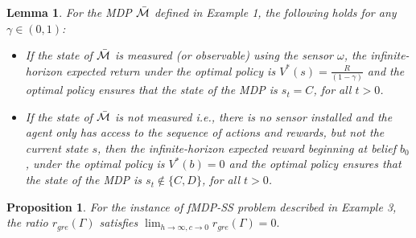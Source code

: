 \documentclass[10pt,a4paper]{amsart}
\newtheorem{lemma}{Lemma}
\newtheorem{proposition}{Proposition}
\begin{document}
 \begin{lemma}
 \label{lma1}
For the MDP $\Bar{\mathcal{M}}$ defined in Example 1, the following holds for any $\gamma\in (0,1)$:
\begin{itemize}
    \item [(i)] If the state of  $\Bar{\mathcal{M}}$ is measured (or observable) using the sensor $\omega$, the infinite-horizon expected return under the optimal policy is $V^*(s) = \frac{R}{(1-\gamma)}$ and the optimal policy ensures that the state of the MDP is $s_t=C$, for all $t>0$. 
    \item[(ii)] If the state of $\Bar{\mathcal{M}}$ is not measured i.e., there is no sensor installed and the agent only has access to the sequence of actions and rewards, but not the current state $s$, then the infinite-horizon expected reward beginning at belief $b_0$, under the optimal policy is $V^*(b) = 0$ and the optimal policy ensures that the state of the MDP is $s_t\notin  \{C,D\}$, for all $t>0$. 
\end{itemize}
\end{lemma} 

\begin{proposition}
\label{prop:1}
For the instance of fMDP-SS problem described in Example 3, the ratio $ r_{gre}(\Gamma)$ satisfies $\lim_{h \rightarrow \infty, c \rightarrow 0} r_{gre}(\Gamma) = 0.$
\end{proposition}
\end{document}
